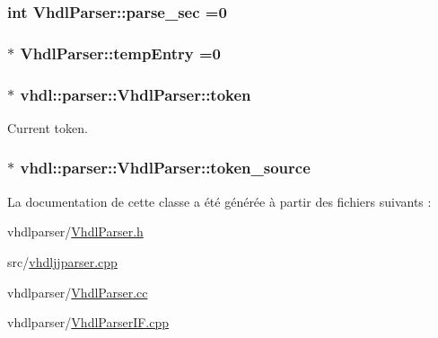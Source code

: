 \subsubsection[{parse\+\_\+sec}]{\setlength{\rightskip}{0pt plus 5cm}int Vhdl\+Parser\+::parse\+\_\+sec =0\hspace{0.3cm}{\ttfamily [static]}}\label{classvhdl_1_1parser_1_1_vhdl_parser_a84ab425ec2f89225d2c362e5721c938c}
\hypertarget{classvhdl_1_1parser_1_1_vhdl_parser_a5ae173ce7aa67ef6d3b77afaac50bd08}{}
\subsubsection[{temp\+Entry}]{ $\ast$ Vhdl\+Parser\+::temp\+Entry =0\hspace{0.3cm}{\ttfamily [static]}}\label{classvhdl_1_1parser_1_1_vhdl_parser_a5ae173ce7aa67ef6d3b77afaac50bd08}
\hypertarget{classvhdl_1_1parser_1_1_vhdl_parser_a608c6d5c2adcbf09ce69f0123e223893}{}
\subsubsection[{token}]{$\ast$ vhdl\+::parser\+::\+Vhdl\+Parser\+::token}\label{classvhdl_1_1parser_1_1_vhdl_parser_a608c6d5c2adcbf09ce69f0123e223893}
Current token. \hypertarget{classvhdl_1_1parser_1_1_vhdl_parser_a14fcf5077ae6f4d2c6fb1be4f4dba05c}{}
\subsubsection[{token\+\_\+source}]{$\ast$ vhdl\+::parser\+::\+Vhdl\+Parser\+::token\+\_\+source}\label{classvhdl_1_1parser_1_1_vhdl_parser_a14fcf5077ae6f4d2c6fb1be4f4dba05c}


La documentation de cette classe a été générée à partir des fichiers suivants \+:\begin{DoxyCompactItemize}
\item 
vhdlparser/\hyperlink{_vhdl_parser_8h}{Vhdl\+Parser.\+h}\item 
src/\hyperlink{vhdljjparser_8cpp}{vhdljjparser.\+cpp}\item 
vhdlparser/\hyperlink{_vhdl_parser_8cc}{Vhdl\+Parser.\+cc}\item 
vhdlparser/\hyperlink{_vhdl_parser_i_f_8cpp}{Vhdl\+Parser\+I\+F.\+cpp}\end{DoxyCompactItemize}
